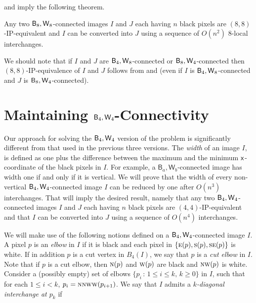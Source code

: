 \documentclass[lotsofwhite,charterfonts]{patmorin}
\newcommand{\foureight}{\ensuremath{\protect\textup{\textsf{B}}_{4},\protect\textup{\textsf{W}}_{8}}}
\newcommand{\eightfour}{\ensuremath{\protect\textup{\textsf{B}}_{8},\protect\textup{\textsf{W}}_{4}}}
\newcommand{\eighteight}{\ensuremath{\protect\textup{\textsf{B}}_{8},\protect\textup{\textsf{W}}_{8}}}
\newcommand{\fourfour}{\ensuremath{\protect\textup{\textsf{B}}_{4},\protect\textup{\textsf{W}}_{4}}}
\newcommand{\N}{\textsc{n}}
\newcommand{\E}{\textsc{e}}
\newcommand{\SE}{\textsc{se}}
\renewcommand{\S}{\textsc{s}}
\newcommand{\W}{\textsc{w}}
\newcommand{\NW}{\textsc{nw}}
\newcommand{\x}{\ensuremath{\protect\textup{\textsf{x}}}}
\newcommand{\ic}[2]{\langle #1,#2 \rangle}
\begin{document}
 and  imply the following theorem.


\begin{thm}
Any two \eighteight-connected images $I$ and $J$ each having $n$
black pixels are $(8,8)$-IP-equivalent and $I$ can be converted into
$J$ using a sequence of $O(n^2)$ 8-local interchanges.
\end{thm}


We should note that if $I$ and $J$ are \foureight-connected or
\eightfour-connected then $(8,8)$-IP-equivalence of $I$ and $J$
follows from  and  (even if $I$ is
\foureight-connected and $J$ is \eightfour-connected).



\section{Maintaining \fourfour-Connectivity}

Our approach for solving the $\fourfour$ version of the problem is
significantly different from that used in the previous three versions.
The \emph{width} of an image $I$, is defined as one plus the
difference between the maximum and the minimum \x-coordinate of the
black pixels in $I$. For example, a
$\textsf{B}_a,\textsf{W}_b$-connected image has width one if and only
if it is vertical. We will prove that the width of every non-vertical
\fourfour-connected image $I$ can be reduced by one after $O(n^3)$
interchanges. That will imply the desired result, namely that any two
\fourfour-connected images $I$ and $J$ each having $n$ black pixels
are $(4,4)$-IP-equivalent and that $I$ can be converted into $J$ using
a sequence of $O(n^4)$ interchanges.

We will make use of the following notions defined on a
\fourfour-connected image $I$. A pixel $p$ is an \emph{elbow} in $I$
if it is black and each pixel in $\{\E(p), \S(p), \SE(p)\}$ is white.
If in addition $p$ is a cut vertex in $B_4(I)$, we say that $p$ is a
\emph{cut elbow} in $I$. Note that if $p$ is a cut elbow, then $\N(p)$
and $\W(p)$ are black and $\NW(p)$ is white. Consider a (possibly
empty) set of elbows $\{p_i\, :\, 1\leq i\leq k, \, k\geq 0\}$ in $I$,
such that for each $1\leq i< k$, $p_i=\N\N\W\W(p_{i+1})$. We say that
$I$ admits a \emph{$k$-diagonal interchange at $p_k$} if 

\end{document}
